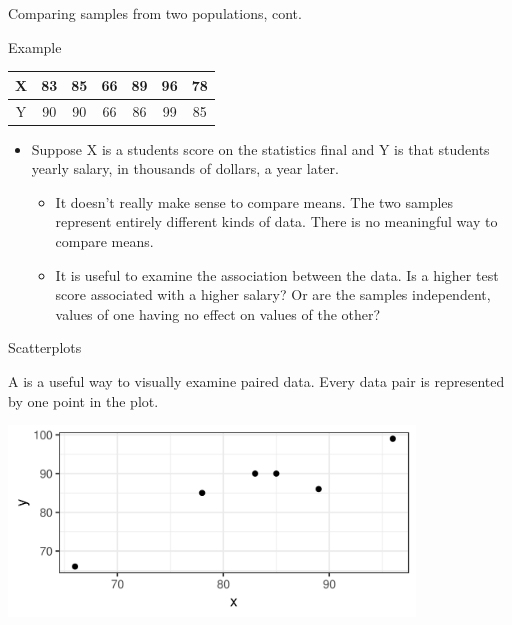 \documentclass[xcolor=table, aspectratio=169, bigger, handout]{beamer}
\begin{document}
\begin{frame}{Comparing samples from two populations, cont.}
\begin{exampleblock}{Example}
\smallskip
{\centering
\begin{tabular}{c | c c c c c c}
X & 83 & 85 & 66 & 89 & 96 & 78\\
\hline
Y & 90 & 90 & 66 & 86 & 99 & 85
\end{tabular}
\par}
\medskip
\begin{itemize}
\item Suppose X is a students score on the statistics final and Y is that students yearly salary, in thousands of dollars, a year later.
\begin{itemize}
\pause\item It doesn't really make sense to compare means. The two samples represent entirely different kinds of data. There is no meaningful way to compare means.
\pause\item It is useful to examine the association between the data. Is a higher test score associated with a higher salary? Or are the samples independent, values of one having no effect on values of the other?
\end{itemize}
\end{itemize}

\end{exampleblock}
\end{frame}

\begin{frame}{Scatterplots}
\begin{block}{}
A  is a useful way to visually examine paired data. Every data pair is represented by one point in the plot.
\end{block}
\bigskip

{\centering
\includegraphics[width=4.25in]{../images/wk11_xy_scatter}
\par}

\end{frame}
\end{document}
